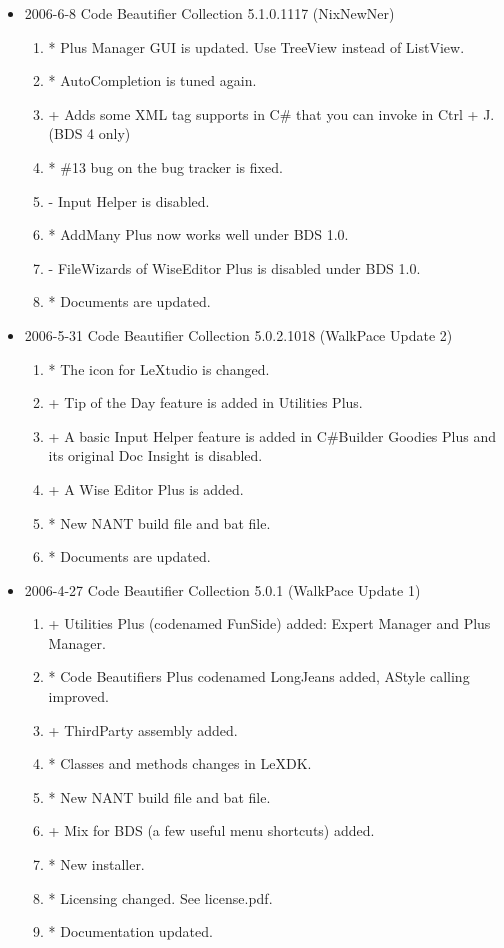 \begin{itemize}
\item 2006-6-8 Code Beautifier Collection 5.1.0.1117 (NixNewNer)
	\begin{enumerate}
	\item * Plus Manager GUI is updated. Use TreeView instead of ListView.
	\item * AutoCompletion is tuned again.
	\item + Adds some XML tag supports in C\# that you can invoke in Ctrl + J. (BDS 4 only)
	\item * \#13 bug on the bug tracker is fixed.
	\item - Input Helper is disabled.
	\item * AddMany Plus now works well under BDS 1.0.
	\item - FileWizards of WiseEditor Plus is disabled under BDS 1.0.
	\item * Documents are updated.
	\end{enumerate}

\item 2006-5-31 Code Beautifier Collection 5.0.2.1018 (WalkPace Update 2)
	\begin{enumerate}
	\item * The icon for LeXtudio is changed.
	\item + Tip of the Day feature is added in Utilities Plus.
	\item + A basic Input Helper feature is added in C\#Builder Goodies Plus and its original Doc Insight is disabled.
	\item + A Wise Editor Plus is added.
	\item * New NANT build file and bat file.
	\item * Documents are updated.
	\end{enumerate}

\item 2006-4-27 Code Beautifier Collection 5.0.1 (WalkPace Update 1)
	\begin{enumerate}
	\item + Utilities Plus (codenamed FunSide) added: Expert Manager and Plus Manager.
	\item * Code Beautifiers Plus codenamed LongJeans added, AStyle calling improved.
	\item + ThirdParty assembly added.
	\item * Classes and methods changes in LeXDK.
	\item * New NANT build file and bat file.
	\item + Mix for BDS (a few useful menu shortcuts) added.
	\item * New installer.
	\item * Licensing changed. See license.pdf.
	\item * Documentation updated.
	\end{enumerate}


\end{itemize}
